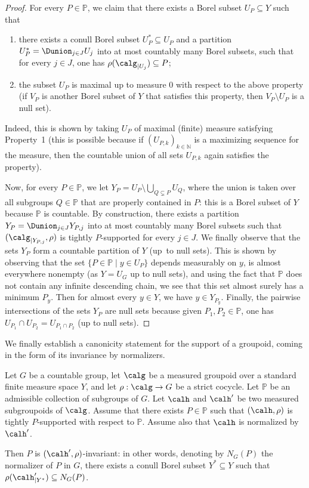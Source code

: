 \begin{proof}
For every $P\in\mathbb{P}$, we claim that there exists a Borel subset $U_P\subseteq Y$ such that
\begin{enumerate}
\item there exists a conull Borel subset $U_P^*\subseteq U_P$ and a partition $U_P^*=\Dunion_{j\in J} U_j$ into at most countably many Borel subsets, such that for every $j\in J$, one has $\rho(\calg_{|U_j})\subseteq P$;
\item the subset $U_P$ is maximal up to measure $0$ with respect to the above property (\ie if $V_P$ is another Borel subset of $Y$ that satisfies this property, then $V_P\setminus U_P$ is a null set).
\end{enumerate}
Indeed, this is shown by taking $U_P$ of maximal (finite) measure satisfying Property~1 (this is possible because if $(U_{P,k})_{k\in\mathbb{N}}$ is a maximizing sequence for the measure, then the countable union of all sets $U_{P,k}$ again satisfies the property).

Now, for every $P\in\mathbb{P}$, we let $Y_P=U_P\setminus\bigcup_{Q\subsetneq P} U_Q$, where the union is taken over all subgroups $Q\in\mathbb{P}$ that are properly contained in $P$: this is a Borel subset of $Y$ because $\mathbb{P}$ is countable. By construction, there exists a partition $Y_P=\Dunion_{j\in J}Y_{P,j}$ into at most countably many Borel subsets such that $(\calg_{|Y_{P,j}},\rho)$ is tightly $P$-supported for every $j\in J$. We finally observe that the sets $Y_P$ form a countable partition of $Y$ (up~to null sets). This is shown by observing that the set $\{P\in\mathbb{P}\mid y\in U_P\}$ depends measurably on $y$, is almost everywhere nonempty (as $Y=U_G$ up to null sets), and using the fact that $\mathbb{P}$ does not contain any infinite descending chain, we see that this set almost surely has a minimum $P_y$. Then for almost every $y\in Y$, we have $y\in Y_{P_y}$. Finally, the pairwise intersections of the sets $Y_P$ are null sets because given $P_1,P_2\in\mathbb{P}$, one has $U_{P_1}\cap U_{P_2}=U_{P_1\cap P_2}$ (up to null sets).
\end{proof}

We finally establish a canonicity statement for the support of a groupoid, coming in the form of its invariance by normalizers.

\begin{lemma}\label{lemma:support-invariant-normal}
Let $G$ be a countable group, let $\calg$ be a measured groupoid over a standard finite measure space $Y$, and let $\rho:\calg\to G$ be a strict cocycle. Let $\mathbb{P}$ be an admissible collection of subgroups of $G$. Let $\calh$ and $\calh'$ be two measured subgroupoids of $\calg$. Assume that there exists $P\in\mathbb{P}$ such that $(\calh,\rho)$ is tightly $P$-supported with respect to $\mathbb{P}$. Assume also that $\calh$ is normalized by $\calh'$.

Then $P$ is $(\calh',\rho)$-invariant: in other words, denoting by $N_G(P)$ the normalizer of $P$ in $G$, there exists a conull Borel subset $Y^*\subseteq Y$ such that $\rho(\calh'_{|Y^*})\subseteq N_G(P)$.
\end{lemma}

